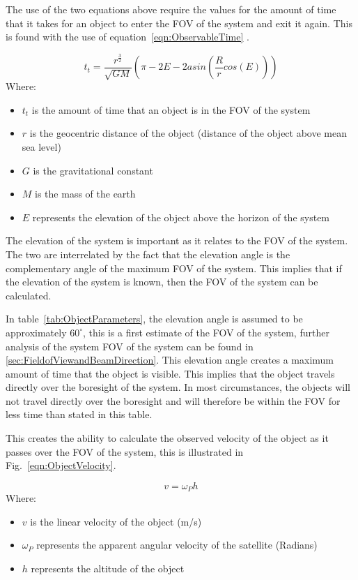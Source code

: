 \documentclass[11pt]{witseiepaper}
\begin{document}
The use of the two equations above require the values for the amount of time that it takes for an object to enter the FOV of the system and exit it again. This is found with the use of equation~\ref{eqn:ObservableTime} \cite{ObservableTime}.

\begin{equation} \label{eqn:ObservableTime}
    t_{t} = \frac{r^{\frac{3}{2}}}{\sqrt{GM}} (\pi - 2E - 2 asin(\frac{R}{r} cos(E)))
\end{equation}
Where:
\begin{itemize}
    \item $t_{t}$ is the amount of time that an object is in the FOV of the system
    \item $r$ is the geocentric distance of the object (distance of the object above mean sea level)
    \item $G$ is the gravitational constant
    \item $M$ is the mass of the earth
    \item $E$ represents the elevation of the object above the horizon of the system
\end{itemize}

The elevation of the system is important as it relates to the FOV of the system. The two are interrelated by the fact that the elevation angle is the complementary angle of the maximum FOV of the system. This implies that if the elevation of the system is known, then the FOV of the system can be calculated.

In table~\ref{tab:ObjectParameters}, the elevation angle is assumed to be approximately $60^{\circ}$, this is a first estimate of the FOV of the system, further analysis of the system FOV of the system can be found in \ref{sec:FieldofViewandBeamDirection}. This elevation angle creates a maximum amount of time that the object is visible. This implies that the object travels directly over the boresight of the system. In most circumstances, the objects will not travel directly over the boresight and will therefore be within the FOV for less time than stated in this table.

This creates the ability to calculate the observed velocity of the object as it passes over the FOV of the system, this is illustrated in Fig.~\ref{eqn:ObjectVelocity}.

\begin{equation} \label{eqn:ObjectVelocity}
    v = \omega_{P} h
\end{equation}
Where:
\begin{itemize}
    \item $v$ is the linear velocity of the object (m/s)
    \item $\omega_{P}$ represents the apparent angular velocity of the satellite (Radians)
    \item $h$ represents the altitude of the object
\end{itemize}
\end{document}
